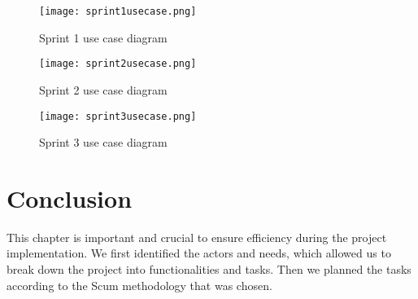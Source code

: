 \begin{figure}[!ht]
\centering
     \texttt{[image: sprint1usecase.png]}
    \caption{Sprint 1 use case diagram}
    \label{fig:sprint1usecase}
\end{figure}

\begin{figure}[!ht]
    \centering
    \texttt{[image: sprint2usecase.png]}
    \caption{Sprint 2 use case diagram}
    \label{fig:sprint2usecase}
\end{figure}


\begin{figure}[!ht]
    \centering
    \texttt{[image: sprint3usecase.png]}
    \caption{Sprint 3 use case diagram}
    \label{fig:sprint3usecase}
\end{figure}

\section*{Conclusion}
This chapter is important and crucial to ensure efficiency during the project implementation. We first identified the actors and needs, which allowed us to break down the project into functionalities and tasks. Then we planned the tasks according to the Scum methodology that was chosen.
